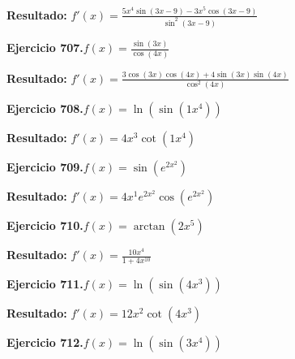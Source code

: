\documentclass[10pt,a4paper]{article}
\begin{document}
\begin{solbox}
\textbf{Resultado:} \(\displaystyle f'(x) = \frac{5x^{4}\sin(3x -9) - 3x^{5}\cos(3x -9)}{\sin^2(3x -9)}\)
\end{solbox}

\begin{ejbox}
\textbf{Ejercicio 707.}\quad $f(x) = \frac{\sin(3x)}{\cos(4x)}$
\end{ejbox}

\begin{solbox}
\textbf{Resultado:} \(\displaystyle f'(x) = \frac{3\cos(3x)\cos(4x) + 4\sin(3x)\sin(4x)}{\cos^2(4x)}\)
\end{solbox}

\begin{ejbox}
\textbf{Ejercicio 708.}\quad $f(x) = \ln(\sin(1x^{4}))$
\end{ejbox}

\begin{solbox}
\textbf{Resultado:} \(\displaystyle f'(x) = 4x^{3}\cot(1x^{4})\)
\end{solbox}

\newpage
\begin{ejbox}
\textbf{Ejercicio 709.}\quad $f(x) = \sin(e^{2x^{2}})$
\end{ejbox}

\begin{solbox}
\textbf{Resultado:} \(\displaystyle f'(x) = 4x^{1}e^{2x^{2}}\cos(e^{2x^{2}})\)
\end{solbox}

\begin{ejbox}
\textbf{Ejercicio 710.}\quad $f(x) = \arctan(2x^{5})$
\end{ejbox}

\begin{solbox}
\textbf{Resultado:} \(\displaystyle f'(x) = \frac{10x^{4}}{1+4x^{10}}\)
\end{solbox}

\begin{ejbox}
\textbf{Ejercicio 711.}\quad $f(x) = \ln(\sin(4x^{3}))$
\end{ejbox}

\begin{solbox}
\textbf{Resultado:} \(\displaystyle f'(x) = 12x^{2}\cot(4x^{3})\)
\end{solbox}

\newpage
\begin{ejbox}
\textbf{Ejercicio 712.}\quad $f(x) = \ln(\sin(3x^{4}))$
\end{ejbox}
\end{document}

